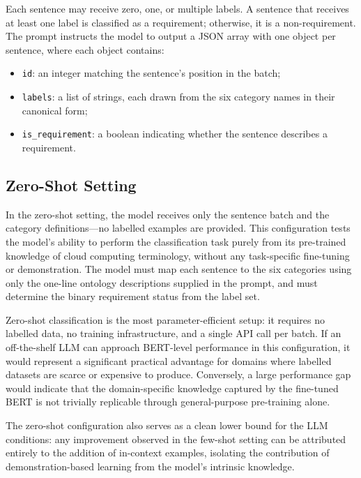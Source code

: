 Each sentence may receive zero, one, or multiple labels. A sentence that receives at least one label is classified as a requirement; otherwise, it is a non-requirement. The prompt instructs the model to output a JSON array with one object per sentence, where each object contains:

\begin{itemize}
    \item \texttt{id}: an integer matching the sentence's position in the batch;
    \item \texttt{labels}: a list of strings, each drawn from the six category names in their canonical form;
    \item \texttt{is\_requirement}: a boolean indicating whether the sentence describes a requirement.
\end{itemize}

\subsection{Zero-Shot Setting}

In the zero-shot setting, the model receives only the sentence batch and the category definitions—no labelled examples are provided. This configuration tests the model's ability to perform the classification task purely from its pre-trained knowledge of cloud computing terminology, without any task-specific fine-tuning or demonstration. The model must map each sentence to the six categories using only the one-line ontology descriptions supplied in the prompt, and must determine the binary requirement status from the label set.

Zero-shot classification is the most parameter-efficient setup: it requires no labelled data, no training infrastructure, and a single API call per batch. If an off-the-shelf LLM can approach BERT-level performance in this configuration, it would represent a significant practical advantage for domains where labelled datasets are scarce or expensive to produce. Conversely, a large performance gap would indicate that the domain-specific knowledge captured by the fine-tuned BERT is not trivially replicable through general-purpose pre-training alone.

The zero-shot configuration also serves as a clean lower bound for the LLM conditions: any improvement observed in the few-shot setting can be attributed entirely to the addition of in-context examples, isolating the contribution of demonstration-based learning from the model's intrinsic knowledge.

